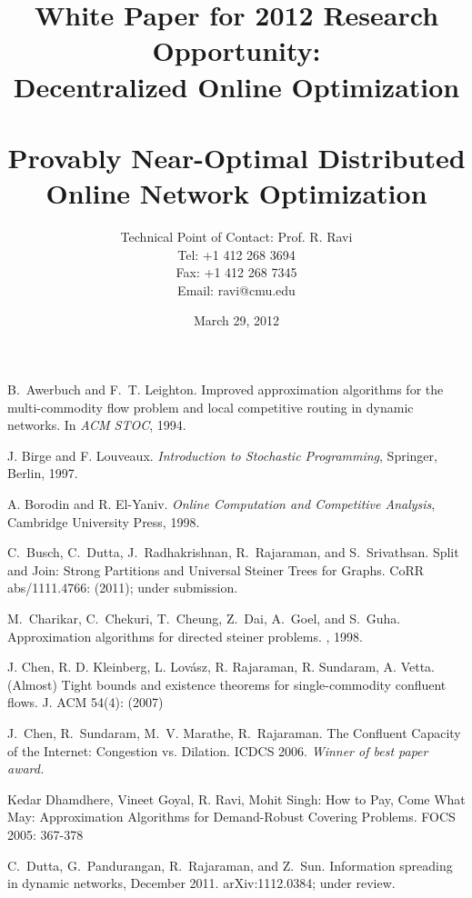 \documentclass{article}
\title{White Paper for 2012 Research Opportunity:\\
Decentralized Online Optimization\\
\ \\
Provably Near-Optimal Distributed Online Network Optimization\\}
\author{Technical Point of Contact: Prof. R. Ravi\\
 Tel: +1 412 268 3694\\
 Fax: +1 412 268 7345\\
 Email: ravi@cmu.edu}
\date{March 29, 2012}
\begin{document}



\maketitle
\titlepage






{\small

\begin{thebibliography}{99}

B.~Awerbuch and F.~T. Leighton.
\newblock Improved approximation algorithms for the multi-commodity flow
  problem and local competitive routing in dynamic networks.
\newblock In {\em ACM STOC}, 1994.

J. Birge and F. Louveaux. {\em Introduction to Stochastic
Programming}, Springer, Berlin, 1997.

A. Borodin and R. El-Yaniv. {\em Online Computation and Competitive Analysis}, Cambridge University Press, 1998.

 C.~Busch, C.~Dutta, J.~Radhakrishnan,
  R.~Rajaraman, and S.~Srivathsan.
\newblock Split and Join: Strong Partitions
  and Universal Steiner Trees for Graphs.
\newblock CoRR abs/1111.4766: (2011); under submission.

M.~Charikar, C.~Chekuri, T.~Cheung, Z.~Dai, A.~Goel, and S.~Guha.
\newblock Approximation algorithms for directed steiner problems.
, 1998.

J. Chen, R. D. Kleinberg, L. Lov\'{a}sz, R. Rajaraman, R. Sundaram, A. Vetta.
\newblock (Almost) Tight bounds and existence theorems for single-commodity confluent flows. 
\newblock J. ACM 54(4): (2007)
 
J.~Chen, R.~Sundaram, M.~V. Marathe, R.~Rajaraman.
\newblock The Confluent Capacity of the Internet: Congestion vs. Dilation. 
\newblock ICDCS 2006.  {\em Winner of best paper award.}

 Kedar Dhamdhere, Vineet Goyal, R. Ravi, Mohit Singh: How to Pay, Come What May: Approximation Algorithms for Demand-Robust Covering Problems. FOCS 2005: 367-378

C.~Dutta, G.~Pandurangan, R.~Rajaraman, and Z.~Sun.
\newblock Information spreading in dynamic networks, December 2011.
\newblock arXiv:1112.0384; under review.


\end{thebibliography}}
\end{document}
